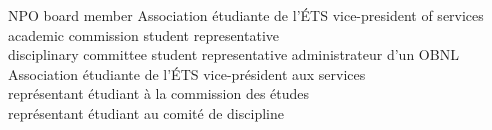 \documentclass[print]{friggeri-cv}
\begin{document}
\begin{entrylist}
  \engfr
  { {{\small NPO} board member} {Association étudiante de l'{\scriptsize ÉTS}} {vice-president of services\\ academic commission student representative \\ disciplinary committee student representative}}
  { {administrateur d'un {\small OBNL}} {Association étudiante de l'{\scriptsize ÉTS}} {vice-président aux services\\représentant étudiant à la commission des études\\représentant étudiant au comité de discipline}}
\end{entrylist}
\newpage
\end{document}
